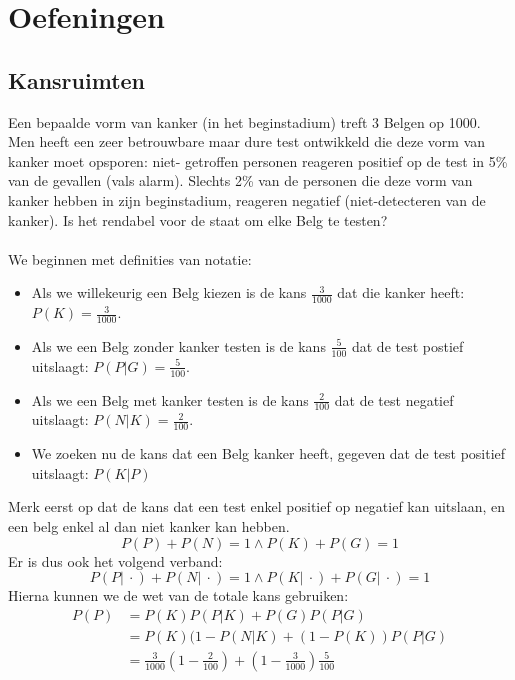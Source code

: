\documentclass[main.tex]{subfiles}
\begin{document}
\chapter{Oefeningen}
\label{cha:oefeningen}

\section{Kansruimten}
\label{sec:kansruimten}
\begin{oef}
  Een bepaalde vorm van kanker (in het beginstadium) treft 3 Belgen op
  1000. Men heeft een zeer betrouwbare maar dure test ontwikkeld die
  deze vorm van kanker moet opsporen: niet- getroffen personen
  reageren positief op de test in 5\% van de gevallen (vals
  alarm). Slechts 2\% van de personen die deze vorm van kanker hebben
  in zijn beginstadium, reageren negatief (niet-detecteren van de
  kanker). Is het rendabel voor de staat om elke Belg te testen?\\\\
  We beginnen met definities van notatie:
  \begin{itemize}
  \item Als we willekeurig een Belg kiezen is de kans $\frac{3}{1000}$ dat die kanker heeft: $P(K) = \frac{3}{1000}$.
  \item Als we een Belg zonder kanker testen is de kans $\frac{5}{100}$ dat de test postief uitslaagt: $P(P|G) = \frac{5}{100}$.
  \item Als we een Belg met kanker testen is de kans $\frac{2}{100}$ dat de test negatief uitslaagt: $P(N|K) = \frac{2}{100}$.
  \item We zoeken nu de kans dat een Belg kanker heeft, gegeven dat de test positief uitslaagt: $P(K|P)$
  \end{itemize}
  Merk eerst op dat de kans dat een test enkel positief op negatief kan uitslaan, en een belg enkel al dan niet kanker kan hebben.
  \[ P(P) + P(N) = 1 \wedge P(K) + P(G) = 1 \]
  Er is dus ook het volgend verband:
  \[ P(P|\ \cdot) + P(N|\ \cdot) = 1  \wedge P(K|\ \cdot) + P(G|\ \cdot) = 1 \]
  Hierna kunnen we de wet van de totale kans gebruiken:
  \[
  \begin{array}{rl}
    P(P)
    &= P(K)P(P|K) + P(G)P(P|G)\\
    &= P(K)(1-P(N|K) + (1-P(K))P(P|G)\\
    &= \frac{3}{1000}\left(1-\frac{2}{100}\right) + \left(1-\frac{3}{1000}\right)\frac{5}{100}\\

\end{array}\]
\end{oef}
\end{document}
